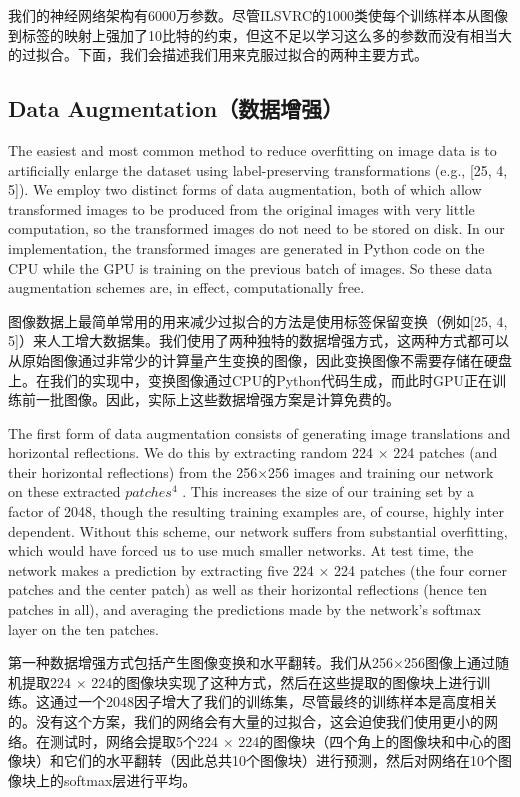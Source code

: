 \documentclass[12pt,a4paper,UTF8,twoside]{book}
\begin{document}
我们的神经网络架构有6000万参数。尽管ILSVRC的1000类使每个训练样本从图像到标签的映射上强加了10比特的约束，但这不足以学习这么多的参数而没有相当大的过拟合。下面，我们会描述我们用来克服过拟合的两种主要方式。

\hypertarget{data-augmentationux6570ux636eux589eux5f3a}{%
\subsection{Data Augmentation（数据增强）}\label{data-augmentationux6570ux636eux589eux5f3a}}

The easiest and most common method to reduce overfitting on image data is to artificially enlarge the dataset using label-preserving transformations (e.g., {[}25, 4, 5{]}). We employ two distinct forms of data augmentation, both of which allow transformed images to be produced from the original images with very little computation, so the transformed images do not need to be stored on disk. In our implementation, the transformed images are generated in Python code on the CPU while the GPU is training on the previous batch of images. So these data augmentation schemes are, in effect, computationally free.

图像数据上最简单常用的用来减少过拟合的方法是使用标签保留变换（例如{[}25, 4, 5{]}）来人工增大数据集。我们使用了两种独特的数据增强方式，这两种方式都可以从原始图像通过非常少的计算量产生变换的图像，因此变换图像不需要存储在硬盘上。在我们的实现中，变换图像通过CPU的Python代码生成，而此时GPU正在训练前一批图像。因此，实际上这些数据增强方案是计算免费的。

The first form of data augmentation consists of generating image translations and horizontal reflections. We do this by extracting random 224 × 224 patches (and their horizontal reflections) from the 256×256 images and training our network on these extracted \(patches^4\) . This increases the size of our training set by a factor of 2048, though the resulting training examples are, of course, highly inter dependent. Without this scheme, our network suffers from substantial overfitting, which would have forced us to use much smaller networks. At test time, the network makes a prediction by extracting five 224 × 224 patches (the four corner patches and the center patch) as well as their horizontal reflections (hence ten patches in all), and averaging the predictions made by the network's softmax layer on the ten patches.

第一种数据增强方式包括产生图像变换和水平翻转。我们从256×256图像上通过随机提取224 × 224的图像块实现了这种方式，然后在这些提取的图像块上进行训练。这通过一个2048因子增大了我们的训练集，尽管最终的训练样本是高度相关的。没有这个方案，我们的网络会有大量的过拟合，这会迫使我们使用更小的网络。在测试时，网络会提取5个224 × 224的图像块（四个角上的图像块和中心的图像块）和它们的水平翻转（因此总共10个图像块）进行预测，然后对网络在10个图像块上的softmax层进行平均。
\end{document}
